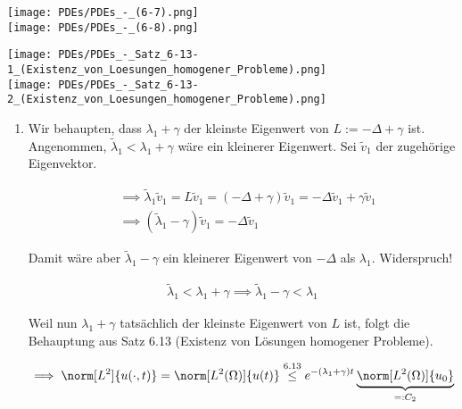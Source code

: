 \begin{solution}

\phantom{}

\begin{tcolorbox}[standard jigsaw, opacityback = 0]
  \center
  \texttt{[image: PDEs/PDEs\_-\_(6-7).png]} \\
  \vspace{0.1 cm}
  \hspace{3 cm}
  \texttt{[image: PDEs/PDEs\_-\_(6-8).png]}
\end{tcolorbox}

\begin{center}
  \texttt{[image: PDEs/PDEs\_-\_Satz\_6-13-1\_(Existenz\_von\_Loesungen\_homogener\_Probleme).png]} \\
  \texttt{[image: PDEs/PDEs\_-\_Satz\_6-13-2\_(Existenz\_von\_Loesungen\_homogener\_Probleme).png]}
\end{center}

\begin{enumerate}[label = (\roman*)]

  \item Wir behaupten, dass $\lambda_1 + \gamma$ der kleinste Eigenwert von $L := -\Delta + \gamma$ ist.
  Angenommen, $\tilde \lambda_1 < \lambda_1 + \gamma$ wäre ein kleinerer Eigenwert.
  Sei $\tilde v_1$ der zugehörige Eigenvektor.

  \begin{align*}
    & \implies
    \tilde \lambda_1 \tilde v_1
    =
    L \tilde v_1
    =
    (-\Delta + \gamma) \tilde v_1
    =
    -\Delta \tilde v_1 + \gamma \tilde v_1 \\
    & \implies
    (\tilde \lambda_1 - \gamma) \tilde v_1
    =
    -\Delta \tilde v_1
  \end{align*}

  Damit wäre aber $\tilde \lambda_1 - \gamma$ ein kleinerer Eigenwert von $-\Delta$ als $\lambda_1$.
  Widerspruch!

  \begin{align*}
    \tilde \lambda_1
    <
    \lambda_1 + \gamma
    \implies
    \tilde \lambda_1 - \gamma
    <
    \lambda_1
  \end{align*}

  Weil nun $\lambda_1 + \gamma$ tatsächlich der kleinste Eigenwert von $L$ ist, folgt die Behauptung aus Satz 6.13 (Existenz von Lösungen homogener Probleme).

  \begin{align*}
    \implies
    \norm[L^2]{u(\cdot, t)}
    =
    \norm[L^2(\Omega)]{u(t)}
    \stackrel
    {
      \mathrm{6.13}
    }{\leq}
    e^{-(\lambda_1 + \gamma) t}
    \underbrace
    {
      \norm[L^2(\Omega)]{u_0}
    }_{
      =: C_2
    }
  \end{align*}


\end{enumerate}
\end{solution}
